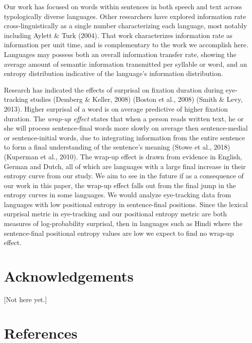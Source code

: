 \documentclass[10pt, letterpaper]{article}
\begin{document}
Our work has focused on words within sentences in both speech and text
across typologically diverse languages. Other researchers have explored
information rate cross-linguistically as a single number characterizing
each language, most notably including Aylett \& Turk (2004). That work
characterizes information rate as information per unit time, and is
complementary to the work we accomplish here. Languages may possess both
an overall information transfer rate, showing the average amount of
semantic information transmitted per syllable or word, and an entropy
distribution indicative of the language's information distribution.

Research has indicated the effects of surprisal on fixation duration
during eye-tracking studies (Demberg \& Keller, 2008) (Boston et al.,
2008) (Smith \& Levy, 2013). Higher surprisal of a word is on average
predictive of higher fixation duration. The \emph{wrap-up effect} states
that when a person reads written text, he or she will process
sentence-final words more slowly on average then sentence-medial or
sentence-initial words, due to integrating information from the entire
sentence to form a final understanding of the sentence's meaning (Stowe
et al., 2018) (Kuperman et al., 2010). The wrap-up effect is drawn from
evidence in English, German and Dutch, all of which are languages with a
large final increase in their entropy curve from our study. We aim to
see in the future if as a consequence of our work in this paper, the
wrap-up effect falls out from the final jump in the entropy curves in
some languages. We would analyze eye-tracking data from languages with
low positional entropy in sentence-final positions. Since the lexical
surprisal metric in eye-tracking and our positional entropy metric are
both measures of log-probability surprisal, then in languages such as
Hindi where the sentence-final positional entropy values are low we
expect to find no wrap-up effect.

\hypertarget{acknowledgements}{%
\section{Acknowledgements}\label{acknowledgements}}

{[}Not here yet.{]}

\hypertarget{references}{%
\section{References}\label{references}}
\end{document}
